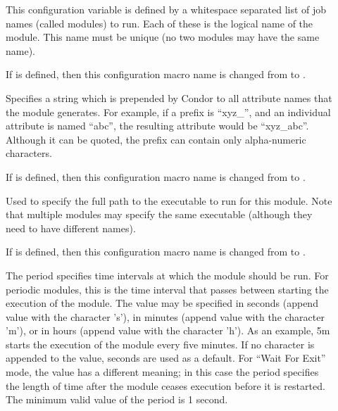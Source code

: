 \begin{description}
\item[]
\label{param:StartdCronJobList}
  This configuration variable is defined by a whitespace separated
  list of job names (called modules) to run.
  Each of these is the logical name of the module.  This name
  must be unique (no two modules may have the same name).

  If 
  is defined, then this configuration macro name is changed from
   to
  .


\item[]
\label{param:StartdCronModulePrefix}
    Specifies a string which is prepended by
    Condor to all attribute names that the module generates.  For
    example, if a prefix is ``xyz\_'', and an individual attribute is
    named ``abc'', the resulting attribute would be ``xyz\_abc''.
    Although it can be quoted, the prefix can contain only
    alpha-numeric characters.

    If 
    is defined, then this configuration macro name is changed from
     to
    .

\item[]
\label{param:StartdCronModuleExecutable}
    Used to specify the full path to the
    executable to run for this module.  Note that multiple modules may
    specify the same executable (although they need to have different
    names).

    If 
    is defined, then this configuration macro name is changed from
     to
    .

\item[]
\label{param:StartdCronModulePeriod}
    The period specifies time intervals at
    which the module should be run.
    For periodic modules, this
    is the time interval that passes between starting the execution
    of the module.
    The value may be specified in seconds (append value with the
    character 's'), in minutes (append value with the character 'm'),
    or in hours (append value with the character 'h').
    As an example, 5m starts the execution of the module every five minutes.
    If no character is appended to the value, seconds are used as a default.
    For ``Wait For Exit'' mode, the value has a different meaning; in
    this case 
    the period specifies the length of time after the module ceases execution
    before it is restarted.
    The minimum valid value of the period is 1 second.


\end{description}

